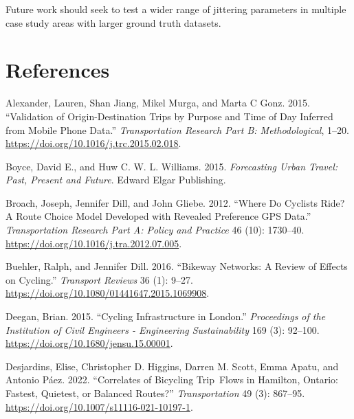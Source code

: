 \documentclass{isprs} %
\newlength{\cslhangindent}
\newlength{\cslentryspacingunit} %
\newenvironment{CSLReferences}[2] %
 {%
  \setlength{\parindent}{0pt}
  \ifodd #1
  \let\oldpar\par
  \def\par{\hangindent=\cslhangindent\oldpar}
  \fi
  \setlength{\parskip}{#2\cslentryspacingunit}
 }%
 {}
\begin{document}
Future work should seek to test a wider range of jittering parameters in multiple case study areas with larger ground truth datasets.

\hypertarget{references}{%
\section*{References}\label{references}}

\hypertarget{refs}{}
\begin{CSLReferences}{1}{0}
\leavevmode{}%
Alexander, Lauren, Shan Jiang, Mikel Murga, and Marta C Gonz. 2015. {``Validation of Origin-Destination Trips by Purpose and Time of Day Inferred from Mobile Phone Data.''} \emph{Transportation Research Part B: Methodological}, 1--20. \url{https://doi.org/10.1016/j.trc.2015.02.018}.

\leavevmode{}%
Boyce, David E., and Huw C. W. L. Williams. 2015. \emph{Forecasting {Urban Travel}: {Past}, {Present} and {Future}}. {Edward Elgar Publishing}.

\leavevmode{}%
Broach, Joseph, Jennifer Dill, and John Gliebe. 2012. {``Where Do Cyclists Ride? {A} Route Choice Model Developed with Revealed Preference {GPS} Data.''} \emph{Transportation Research Part A: Policy and Practice} 46 (10): 1730--40. \url{https://doi.org/10.1016/j.tra.2012.07.005}.

\leavevmode{}%
Buehler, Ralph, and Jennifer Dill. 2016. {``Bikeway {Networks}: {A Review} of {Effects} on {Cycling}.''} \emph{Transport Reviews} 36 (1): 9--27. \url{https://doi.org/10.1080/01441647.2015.1069908}.

\leavevmode{}%
Deegan, Brian. 2015. {``Cycling Infrastructure in {London}.''} \emph{Proceedings of the Institution of Civil Engineers - Engineering Sustainability} 169 (3): 92--100. \url{https://doi.org/10.1680/jensu.15.00001}.

\leavevmode{}%
Desjardins, Elise, Christopher D. Higgins, Darren M. Scott, Emma Apatu, and Antonio Páez. 2022. {``Correlates of Bicycling Trip~Flows in {Hamilton}, {Ontario}: Fastest, Quietest, or Balanced Routes?''} \emph{Transportation} 49 (3): 867--95. \url{https://doi.org/10.1007/s11116-021-10197-1}.


\end{CSLReferences}
\end{document}
